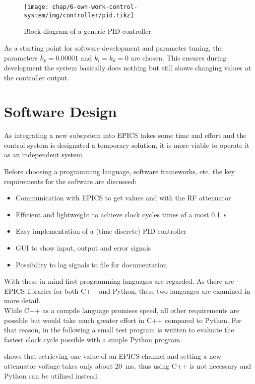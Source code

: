 \begin{figure}[tb]
	\centering
	\texttt{[image: chap/6-own-work-control-system/img/controller/pid.tikz]}
	\caption{Block diagram of a generic PID controller}
	\label{fig:own-work-pid-block}
\end{figure}

As a starting point for software development and parameter tuning, the parameters $k_p=0.00001$ and $k_i=k_d=0$ are chosen. This ensures during development the system basically does nothing but still shows changing values at the controller output.

\FloatBarrier
\section{Software Design}
As integrating a new subsystem into EPICS takes some time and effort and the control system is designated a temporary solution, it is more viable to operate it as an independent system.

Before choosing a programming language, software frameworks, etc. the key requirements for the software are discussed:
\begin{itemize}
\item Communication with EPICS to get values and with the RF attenuator
\item Efficient and lightweight to achieve clock cycles times of a most \SI{0.1}{\second}
\item Easy implementation of a (time discrete) PID controller
\item GUI to show input, output and error signals
\item Possibility to log signals to file for documentation
\end{itemize}

With these in mind first programming languages are regarded. As there are EPICS libraries for both C++ and Python, these two languages are examined in more detail.\\
While C++ as a compile language promises speed, all other requirements are possible but would take much greater effort in C++ compared to Python. For that reason, in the following a small test program is written to evaluate the fastest clock cycle possible with a simple Python program.

 shows that retrieving one value of an EPICS channel and setting a new attenuator voltage takes only about \SI{20}{\milli\second}, thus using C++ is not necessary and Python can be utilized instead.
 
